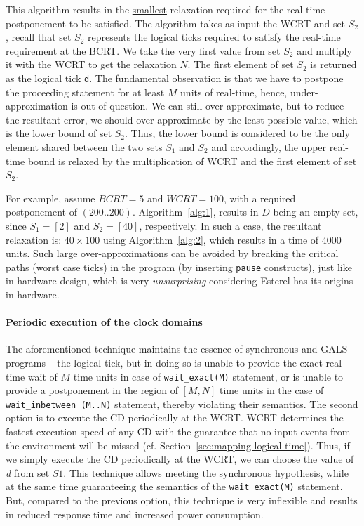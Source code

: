 This algorithm results in the \underline{smallest} relaxation required
for the real-time postponement to be satisfied. The algorithm takes as
input the WCRT and set $S_2$, recall that set $S_2$ represents the
logical ticks required to satisfy the real-time requirement at the
BCRT. We take the very first value from set $S_2$ and multiply it with
the WCRT to get the relaxation $N$. The first element of set $S_2$ is
returned as the logical tick \texttt{d}. The fundamental observation is
that we have to postpone the proceeding statement for at least $M$ units
of real-time, hence, under-approximation is out of question. We can
still over-approximate, but to reduce the resultant error, we should
over-approximate by the least possible value, which is the lower bound
of set $S_2$. Thus, the lower bound is considered to be the only element
shared between the two sets $S_1$ and $S_2$ and accordingly, the upper
real-time bound is relaxed by the multiplication of WCRT and the first
element of set $S_2$.

For example, assume $BCRT=5$ and $WCRT=100$, with a required
postponement of $(200..200)$. Algorithm~\ref{alg:1}, results in $D$
being an empty set, since $S_1=[2]$ and $S_2=[40]$, respectively. In
such a case, the resultant relaxation is: $40 \times 100$ using
Algorithm~\ref{alg:2}, which results in a time of $4000$ units. Such
large over-approximations can be avoided by breaking the critical paths
(worst case ticks) in the program (by inserting \texttt{pause}
constructs), just like in hardware design, which is very
\textit{unsurprising} considering Esterel has its origins in hardware.

\paragraph{Periodic execution of the clock domains}
\label{sec:peri-exec-clock}

The aforementioned technique maintains the essence of synchronous and
GALS programs -- the logical tick, but in doing so is unable to provide
the exact real-time wait of $M$ time units in case of
\texttt{wait\_exact(M)} statement, or is unable to provide a
postponement in the region of $[M, N]$ time units in the case of
\texttt{wait\_inbetween (M..N)} statement, thereby violating their
semantics. The second option is to execute the CD periodically at the
WCRT. WCRT determines the fastest execution speed of any CD with the
guarantee that no input events from the environment will be missed
(cf. Section~\ref{sec:mapping-logical-time}). Thus, if we simply execute
the CD periodically at the WCRT, we can choose the value of \textit{d}
from set $S1$. This technique allows meeting the synchronous hypothesis,
while at the same time guaranteeing the semantics of the
\texttt{wait\_exact(M)} statement. But, compared to the previous option,
this technique is very inflexible and results in reduced response time
and increased power consumption.

